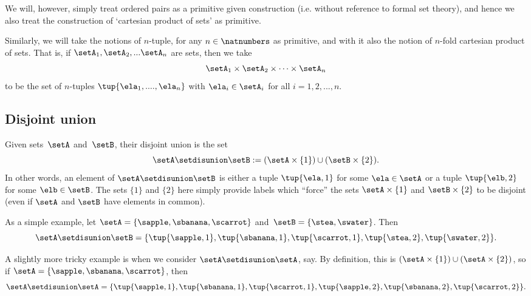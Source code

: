 We will, however, simply treat ordered pairs as a primitive given construction (i.e. without reference to formal set theory), and hence we also treat the construction of `cartesian product of sets' as primitive. 

Similarly, we will take the notions of $n$-tuple, for any $n \in \natnumbers$ as primitive, and with it also the notion of $n$-fold cartesian product of sets. That is, if $\setA_1, \setA_2, ... \setA_n$ are sets, then we take 
\begin{equation}
\setA_1 \times \setA_2 \times \dots \times \setA_n
\end{equation}
to be the set of $n$-tuples $\tup{\ela_1, ...., \ela_n}$ with $\ela_i \in \setA_i$ for all $i = 1,2,...,n$. 

\subsection{Disjoint union}

Given sets~$\setA$ and~$\setB$, their disjoint union is the set
\begin{equation*}
    \setA \setdisunion \setB := (\setA \times \{ 1 \}) \cup (\setB \times \{2\}).
\end{equation*}
In other words, an element of  $\setA \setdisunion \setB$ is either a tuple $\tup{\ela, 1}$ for some  $\ela \in \setA$ or a tuple $\tup{\elb, 2}$ for some $\elb \in \setB$. The sets $\{ 1 \}$ and $\{2\}$ here simply provide labels which ``force'' the sets $\setA \times \{ 1 \}$ and $\setB \times \{2\}$ to be disjoint (even if $\setA$ and $\setB$ have elements in common). 

As a simple example, let $\setA = \{ \sapple, \sbanana, \scarrot\}$ and~$\setB = \{ \stea, \swater \}$. Then
\begin{equation*}
    \setA \setdisunion \setB = \{ \tup{\sapple, 1}, \tup{\sbanana, 1}, \tup{\scarrot, 1}, \tup{\stea, 2},  \tup{\swater, 2}\}.
\end{equation*}

A slightly more tricky example is when we consider $\setA \setdisunion \setA$, say. By definition, this is $(\setA \times \{ 1 \}) \cup (\setA \times \{2\})$, so if $\setA = \{ \sapple, \sbanana, \scarrot\}$, then 
\begin{equation*}
\setA \setdisunion \setA = \{ \tup{\sapple, 1}, \tup{\sbanana, 1}, \tup{\scarrot, 1}, \tup{\sapple, 2}, \tup{\sbanana, 2}, \tup{\scarrot, 2} \}.
\end{equation*}


